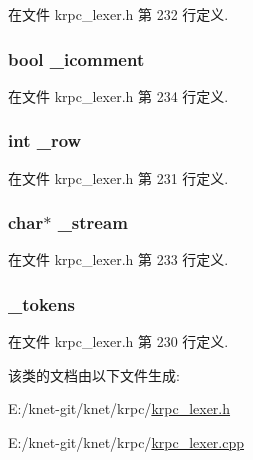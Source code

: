 在文件 krpc\+\_\+lexer.\+h 第 232 行定义.

\hypertarget{classkrpc__lexer__t_a1dff5704d4f4cf03e612b387f2e0e8f3}{}
\subsubsection[{\+\_\+icomment}]{\setlength{\rightskip}{0pt plus 5cm}bool \+\_\+icomment\hspace{0.3cm}{\ttfamily [private]}}\label{classkrpc__lexer__t_a1dff5704d4f4cf03e612b387f2e0e8f3}


在文件 krpc\+\_\+lexer.\+h 第 234 行定义.

\hypertarget{classkrpc__lexer__t_a2c788815cbc67c3734ad77878c81dda8}{}
\subsubsection[{\+\_\+row}]{\setlength{\rightskip}{0pt plus 5cm}int \+\_\+row\hspace{0.3cm}{\ttfamily [private]}}\label{classkrpc__lexer__t_a2c788815cbc67c3734ad77878c81dda8}


在文件 krpc\+\_\+lexer.\+h 第 231 行定义.

\hypertarget{classkrpc__lexer__t_a20b4eb27ad7e1ff727fdb2e25d7fd04a}{}
\subsubsection[{\+\_\+stream}]{\setlength{\rightskip}{0pt plus 5cm}char$\ast$ \+\_\+stream\hspace{0.3cm}{\ttfamily [private]}}\label{classkrpc__lexer__t_a20b4eb27ad7e1ff727fdb2e25d7fd04a}


在文件 krpc\+\_\+lexer.\+h 第 233 行定义.

\hypertarget{classkrpc__lexer__t_aaf4e19b186e6ebcb707160ec088ac91c}{}
\subsubsection[{\+\_\+tokens}]{ \+\_\+tokens\hspace{0.3cm}{\ttfamily [private]}}\label{classkrpc__lexer__t_aaf4e19b186e6ebcb707160ec088ac91c}


在文件 krpc\+\_\+lexer.\+h 第 230 行定义.



该类的文档由以下文件生成\+:\begin{DoxyCompactItemize}
\item 
E\+:/knet-\/git/knet/krpc/\hyperlink{krpc__lexer_8h}{krpc\+\_\+lexer.\+h}\item 
E\+:/knet-\/git/knet/krpc/\hyperlink{krpc__lexer_8cpp}{krpc\+\_\+lexer.\+cpp}\end{DoxyCompactItemize}
